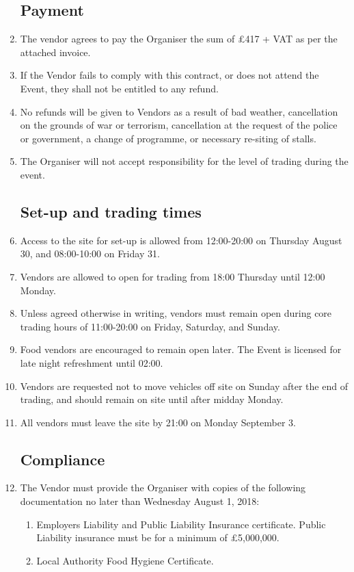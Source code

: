 \begin{enumerate}

\subsection*{Payment}
\item The vendor agrees to pay the Organiser the sum of £417 + VAT as per the attached invoice.
\item If the Vendor fails to comply with this contract, or does not attend the Event,
        they shall not be entitled to any refund.
\item No refunds will be given to Vendors as a result of bad weather, cancellation on the
        grounds of war or terrorism, cancellation at the request of the police or government,
        a change of programme, or necessary re-siting of stalls.
\item The Organiser will not accept responsibility for the level of trading during the event.

\subsection*{Set-up and trading times}
\item Access to the site for set-up is allowed from 12:00-20:00 on Thursday August 30, and
        08:00-10:00 on Friday 31.
\item Vendors are allowed to open for trading from 18:00 Thursday until 12:00 Monday.
\item Unless agreed otherwise in writing, vendors must remain open during core trading
        hours of 11:00-20:00 on Friday, Saturday, and Sunday.
\item Food vendors are encouraged to remain open later. The Event is licensed for late
        night refreshment until 02:00.
\item Vendors are requested not to move vehicles off site on Sunday after the end of
        trading, and should remain on site until after midday Monday.
\item All vendors must leave the site by 21:00 on Monday September 3.

\subsection*{Compliance}
\item The Vendor must provide the Organiser with copies of the following documentation no later
        than Wednesday August 1, 2018:
\begin{enumerate}
    \item Employers Liability and Public Liability Insurance certificate.
            Public Liability insurance must be for a minimum of £5,000,000.
    \item Local Authority Food Hygiene Certificate.
\end{enumerate}


\end{enumerate}
